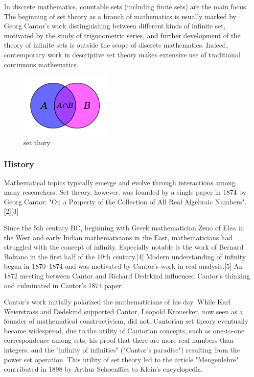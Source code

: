 \documentclass{article}
\begin{document}
In discrete mathematics, countable sets (including finite sets) are the main focus. The beginning of set theory as a branch of mathematics is usually marked by Georg Cantor's work distinguishing between different kinds of infinite set, motivated by the study of trigonometric series, and further development of the theory of infinite sets is outside the scope of discrete mathematics. Indeed, contemporary work in descriptive set theory makes extensive use of traditional continuous mathematics. 
\begin{figure}[h]
\includegraphics[width=0.4\textwidth]{sg.png}
\caption{set thory}
\end{figure}
\newpage
\subsubsection{History}
Mathematical topics typically emerge and evolve through interactions among many researchers. Set theory, however, was founded by a single paper in 1874 by Georg Cantor: "On a Property of the Collection of All Real Algebraic Numbers".[2][3]

Since the 5th century BC, beginning with Greek mathematician Zeno of Elea in the West and early Indian mathematicians in the East, mathematicians had struggled with the concept of infinity. Especially notable is the work of Bernard Bolzano in the first half of the 19th century.[4] Modern understanding of infinity began in 1870–1874 and was motivated by Cantor's work in real analysis.[5] An 1872 meeting between Cantor and Richard Dedekind influenced Cantor's thinking and culminated in Cantor's 1874 paper.

Cantor's work initially polarized the mathematicians of his day. While Karl Weierstrass and Dedekind supported Cantor, Leopold Kronecker, now seen as a founder of mathematical constructivism, did not. Cantorian set theory eventually became widespread, due to the utility of Cantorian concepts, such as one-to-one correspondence among sets, his proof that there are more real numbers than integers, and the "infinity of infinities" ("Cantor's paradise") resulting from the power set operation. This utility of set theory led to the article "Mengenlehre" contributed in 1898 by Arthur Schoenflies to Klein's encyclopedia.
\end{document}
